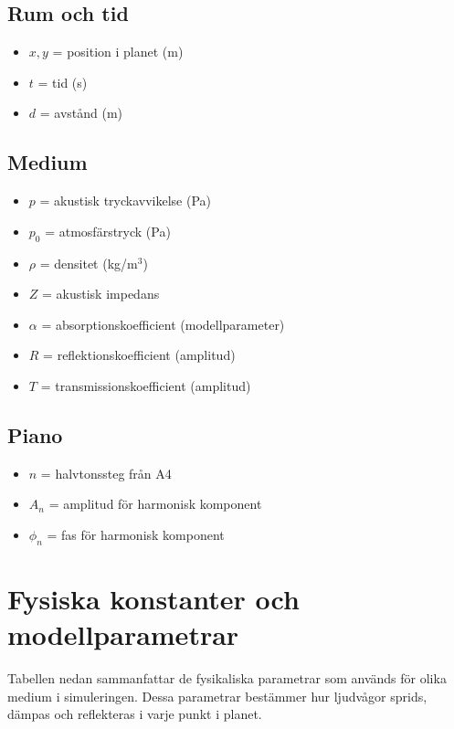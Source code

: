 \documentclass[11pt,a4paper]{article}
\begin{document}
\subsection*{Rum och tid}
\begin{itemize}[leftmargin=*,nosep]
  \item $x,y$ = position i planet (m)
  \item $t$ = tid (s)
  \item $d$ = avstånd (m)
\end{itemize}

\subsection*{Medium}
\begin{itemize}[leftmargin=*,nosep]
  \item $p$ = akustisk tryckavvikelse (Pa)
  \item $p_0$ = atmosfärstryck (Pa)
  \item $\rho$ = densitet (kg/m$^3$)
  \item $Z$ = akustisk impedans
  \item $\alpha$ = absorptionskoefficient (modellparameter)
  \item $R$ = reflektionskoefficient (amplitud)
  \item $T$ = transmissionskoefficient (amplitud)
\end{itemize}

\subsection*{Piano}
\begin{itemize}[leftmargin=*,nosep]
  \item $n$ = halvtonssteg från A4
  \item $A_n$ = amplitud för harmonisk komponent
  \item $\phi_n$ = fas för harmonisk komponent
\end{itemize}


\clearpage
\section{Fysiska konstanter och modellparametrar}

Tabellen nedan sammanfattar de fysikaliska parametrar som används
för olika medium i simuleringen. Dessa parametrar bestämmer hur
ljudvågor sprids, dämpas och reflekteras i varje punkt i planet.
\end{document}
